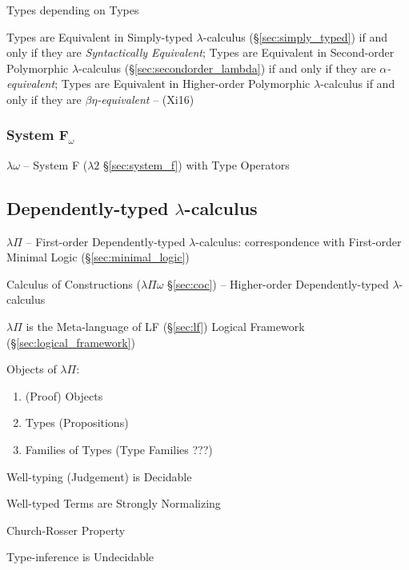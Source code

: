 Types depending on Types

Types are Equivalent in Simply-typed $\lambda$-calculus
(\S\ref{sec:simply_typed}) if and only if they are \emph{Syntactically
  Equivalent}; Types are Equivalent in Second-order Polymorphic
$\lambda$-calculus (\S\ref{sec:secondorder_lambda}) if and only if
they are \emph{$\alpha$-equivalent}; Types are Equivalent in
Higher-order Polymorphic $\lambda$-calculus if and only if they are
\emph{$\beta\eta$-equivalent} -- (Xi16)



\subsubsection{System F$_\omega$}\label{sec:system_fomega}

$\lambda\omega$ -- System F ($\lambda2$ \S\ref{sec:system_f}) with
Type Operators



\subsection{Dependently-typed $\lambda$-calculus}
\label{sec:dependent_lambda}

$\lambda\Pi$ -- First-order Dependently-typed $\lambda$-calculus:
correspondence with First-order Minimal Logic
(\S\ref{sec:minimal_logic})

Calculus of Constructions ($\lambda\Pi\omega$ \S\ref{sec:coc}) --
Higher-order Dependently-typed $\lambda$-calculus

$\lambda\Pi$ is the Meta-language of LF (\S\ref{sec:lf}) Logical
Framework (\S\ref{sec:logical_framework})

Objects of $\lambda\Pi$:
\begin{enumerate}
  \item (Proof) Objects
  \item Types (Propositions)
  \item Families of Types (Type Families ???)
\end{enumerate}

Well-typing (Judgement) is Decidable %

Well-typed Terms are Strongly Normalizing

Church-Rosser Property

\fist Type-inference is Undecidable %

